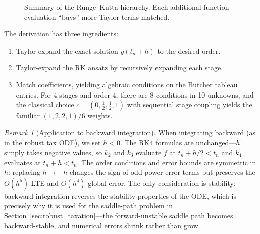 \documentclass[12pt,a4paper]{article}
\theoremstyle{definition}
\theoremstyle{plain}
\theoremstyle{remark}
\newtheorem{remark}{Remark}[section]
\begin{document}
\begin{figure}[ht]
\centering
{}
\caption{Summary of the Runge--Kutta hierarchy. Each additional function evaluation ``buys'' more Taylor terms matched.}
\label{fig:summary}
\end{figure}

The derivation has three ingredients:
\begin{enumerate}
  \item Taylor-expand the exact solution $y(t_n + h)$ to the desired order.
  \item Taylor-expand the RK ansatz by recursively expanding each stage.
  \item Match coefficients, yielding algebraic conditions on the Butcher tableau entries. For 4 stages and order 4, there are 8 conditions in 10 unknowns, and the classical choice $c = (0, \tfrac{1}{2}, \tfrac{1}{2}, 1)$ with sequential stage coupling yields the familiar $(1,2,2,1)/6$ weights.
\end{enumerate}


\begin{remark}[Application to backward integration]
\label{rem:rk4_backward}
When integrating backward (as in the robust tax ODE), we set $h < 0$. The RK4 formulas are unchanged---$h$ simply takes negative values, so $k_2$ and $k_3$ evaluate $f$ at $t_n + h/2 < t_n$ and $k_4$ evaluates at $t_n + h < t_n$. The order conditions and error bounds are symmetric in $h$: replacing $h \to -h$ changes the sign of odd-power error terms but preserves the $O(h^5)$ LTE and $O(h^4)$ global error. The only consideration is stability: backward integration reverses the stability properties of the ODE, which is precisely why it is used for the saddle-path problem in Section~\ref{sec:robust_taxation}---the forward-unstable saddle path becomes backward-stable, and numerical errors shrink rather than grow.
\end{remark}
\end{document}
